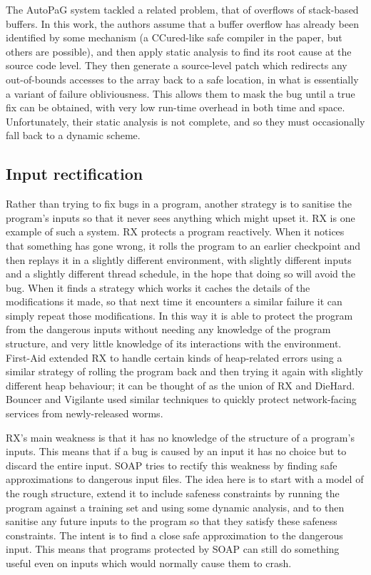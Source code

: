 The AutoPaG system\cite{Lin2007} tackled a related problem, that of
overflows of stack-based buffers.  In this work, the authors assume
that a buffer overflow has already been identified by some mechanism
(a CCured\cite{Necula2005}-like safe compiler in the paper, but others
are possible), and then apply static analysis to find its root cause
at the source code level.  They then generate a source-level patch
which redirects any out-of-bounds accesses to the array back to a safe
location, in what is essentially a variant of failure obliviousness.
This allows them to mask the bug until a true fix can be obtained,
with very low run-time overhead in both time and space.
Unfortunately, their static analysis is not complete, and so they
must occasionally fall back to a dynamic scheme.

\subsection{Input rectification}

Rather than trying to fix bugs in a program, another strategy is to
sanitise the program's inputs so that it never sees anything which
might upset it.  RX\cite{Qin2007} is one example of such a system.  RX
protects a program reactively.  When it notices that something has
gone wrong, it rolls the program to an earlier checkpoint and then
replays it in a slightly different environment, with slightly
different inputs and a slightly different thread schedule, in the hope
that doing so will avoid the bug.  When it finds a strategy which
works it caches the details of the modifications it made, so that next
time it encounters a similar failure it can simply repeat those
modifications.  In this way it is able to protect the program from the
dangerous inputs without needing any knowledge of the program
structure, and very little knowledge of its interactions with the
environment.  First-Aid\cite{Gao2009} extended RX to handle certain
kinds of heap-related errors using a similar strategy of rolling the
program back and then trying it again with slightly different heap
behaviour; it can be thought of as the union of RX and DieHard.
Bouncer\cite{Costa2007} and Vigilante\cite{Costa2008} used similar
techniques to quickly protect network-facing services from
newly-released worms.

RX's main weakness is that it has no knowledge of the structure of a
program's inputs.  This means that if a bug is caused by an input it
has no choice but to discard the entire input.  SOAP\cite{Long2012}
tries to rectify this weakness by finding safe approximations to
dangerous input files.  The idea here is to start with a model of the
rough structure, extend it to include safeness constraints by running
the program against a training set and using some dynamic analysis,
and to then sanitise any future inputs to the program so that they
satisfy these safeness constraints.  The intent is to find a close
safe approximation to the dangerous input.  This means that programs
protected by SOAP can still do something useful even on inputs which
would normally cause them to crash.

